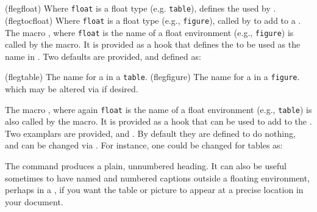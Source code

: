 \begin{syntax}
\cmd{\flegfloat} \\
\cmd{\flegtocfloat} \\
\end{syntax}
\glossary(flegfloat)%
  {}%
  {Where \texttt{float} is a float type (e.g. \texttt{table}), defines the  used by .}
\glossary(flegtocfloat)%
  {}%
  {Where \texttt{float} is a float type (e.g., \texttt{figure}), called by 
    to add  to a \listofx.}
 The macro \cmd{\flegfloat}, where \texttt{float} is the name 
of a float environment
(e.g., \texttt{figure}) is called by the \cmd{\namedlegend} macro. 
It is provided as a hook that defines the  to be used as 
the name in \cmd{\namedlegend}. Two defaults are provided, \cmd{\flegtable}
and \cmd{\flegfigure} defined as:
 \begin{lcode}
 \newcommand{\flegtable}{\tablename}
 \newcommand{\flegfigure}{\figurename}
 \end{lcode}
\glossary(flegtable)%
  {}%
  {The name for a  in a \texttt{table}.}
\glossary(flegfigure)%
  {}%
  {The name for a  in a \texttt{figure}.}
which may be altered via \cmd{\renewcommand} if desired. 

The macro \cmd{\flegtocfloat}, where again \texttt{float} is the name 
of a float environment
(e.g., \texttt{table}) is also called by the \cmd{\namedlegend} macro. 
It is provided as a hook that can be used to add  to the \listofx.
Two examplars are provided, \cmd{\flegtocfigure} and \cmd{\flegtoctable}.
By default they are defined to do nothing, and can be changed via
\cmd{\renewcommand}. For instance, one could be changed for 
tables as:
 \begin{lcode}
 \renewcommand{\flegtoctable}[1]{
   \addcontentsline{lot}{table}{#1}}
 \end{lcode}


  The \cmd{\legend} command produces a plain, unnumbered heading. It can also
be useful sometimes to have named and numbered captions outside
a floating environment, perhaps in a ,
if you want the table or picture 
to appear at a precise location in your document.


